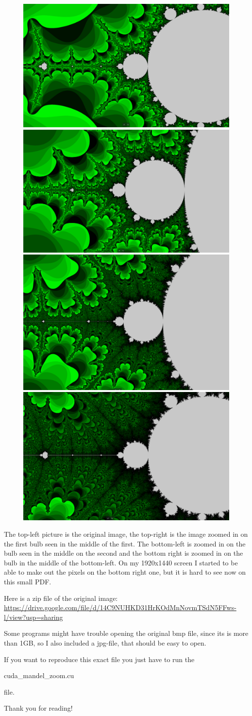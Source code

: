 \documentclass{article}
\begin{document}
\begin{figure}[H]
  \centering
  \includegraphics[width=0.48\linewidth]{original_mandelbrot.png}
  \includegraphics[width=0.48\linewidth]{mandelbrot_zoom_1.png}
  \includegraphics[width=0.48\linewidth]{mandelbrot_zoom_2.png}
  \includegraphics[width=0.48\linewidth]{mandelbrot_zoom_3.png}
\end{figure}

The top-left picture is the original image, the top-right is the image zoomed in on the first
bulb seen in the middle of the first. The bottom-left is zoomed in on the bulb seen in the
middle on the second and the bottom right is zoomed in on the bulb in the middle of the
bottom-left. On my 1920x1440 screen I started to be able to make out the pixels on the bottom
right one, but it is hard to see now on this small PDF.

Here is a zip file of the original image:\\
\href{https://drive.google.com/file/d/14C9NUHKD31HrKOdMnNovmTSdN5FFws-l/view?usp=sharing}{https://drive.google.com/file/d/14C9NUHKD31HrKOdMnNovmTSdN5FFws-l/view?usp=sharing}

Some programs might have trouble opening the original bmp file, since its is more than 1GB, so
I also included a jpg-file, that should be easy to open.

If you want to reproduce this exact file you just have to run the 

cuda\_mandel\_zoom.cu 


file.


Thank you for reading!
\end{document}
